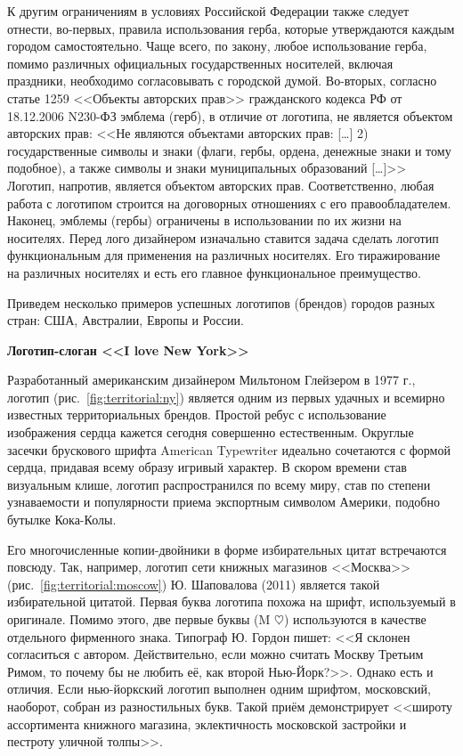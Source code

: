 К другим ограничениям в условиях Российской Федерации также следует отнести, во-первых, правила
использования герба, которые утверждаются каждым городом самостоятельно. Чаще всего, по закону,
любое использование герба, помимо различных официальных государственных носителей, включая
праздники, необходимо согласовывать с городской думой.  Во-вторых, согласно статье 1259 <<Объекты
авторских прав>> гражданского кодекса РФ от 18.12.2006 N230-ФЗ  эмблема (герб), в отличие от
логотипа, не является объектом авторских прав: <<Не являются объектами авторских прав: [\ldots] 2)
государственные символы и знаки (флаги, гербы, ордена, денежные знаки и тому подобное), а также
символы и знаки муниципальных образований [\ldots]>> Логотип,
напротив, является объектом авторских прав. Соответственно, любая работа с логотипом строится на
договорных отношениях с его правообладателем. Наконец, эмблемы (гербы) ограничены в использовании по
их жизни на носителях. Перед лого дизайнером изначально ставится задача сделать логотип
функциональным для применения на различных носителях. Его тиражирование на различных носителях и
есть его главное функциональное преимущество.

Приведем несколько примеров успешных логотипов (брендов) городов разных стран: США, Австралии,
Европы и России.

\textbf{Логотип-слоган <<I love New York>>}

Разработанный американским дизайнером Мильтоном Глейзером в 1977 г., логотип
(рис.~\ref{fig:territorial:ny}) является одним из первых удачных и всемирно известных
территориальных брендов. Простой ребус с использование изображения сердца кажется сегодня совершенно
естественным. Округлые засечки брускового шрифта American Typewriter идеально сочетаются с формой
сердца, придавая всему образу игривый характер. В скором времени став визуальным клише, логотип
распространился по всему миру, став по степени узнаваемости и популярности приема экспортным
символом Америки, подобно бутылке Кока-Колы.

Его многочисленные копии-двойники в форме избирательных цитат встречаются повсюду. Так, например,
логотип сети книжных магазинов <<Москва>> (рис.~\ref{fig:territorial:moscow}) Ю. Шаповалова (2011)
является такой избирательной цитатой. Первая буква логотипа похожа на шрифт, используемый в
оригинале. Помимо этого, две первые буквы (M $\heartsuit$) используются в качестве отдельного
фирменного знака. Типограф Ю. Гордон пишет: <<Я склонен согласиться с автором. Действительно, если
можно считать Москву Третьим Римом, то почему бы не любить её, как второй Нью-Йорк?>>.
\autocite[][347]{book:gordon} Однако есть и отличия. Если нью-йоркский логотип выполнен одним
шрифтом, московский, наоборот, собран из разностильных букв. Такой приём демонстрирует <<широту
ассортимента книжного магазина, эклектичность московской застройки и пестроту уличной толпы>>.
\autocite[][347]{book:gordon}

